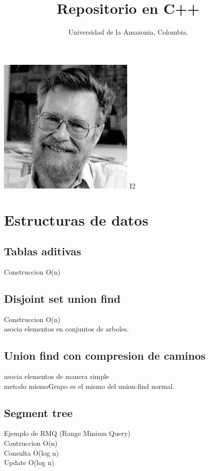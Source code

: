 \documentclass[10pt,landscape,twocolumn,a4paper,notitlepage]{article}
\newcommand\cppfile[2][]{

}
\begin{document}
	
	\title{Repositorio en C++}
	\author{Universidad de la Amazonia, Colombia.}
	\maketitle
	
	\begin{center}
		\includegraphics[scale=0.9]{dijkstra}
		\Huge{I2}
	\end{center}
	\normalsize
	\tableofcontents
	\hfill
	
		\section{Estructuras de datos}
			\subsection{Tablas aditivas}
			Construccion O(n)
			\cppfile[16-28]{estructuras_de_datos/tablas_aditivas.cpp}
			\subsection{Disjoint set union find}
			Construccion O(n)\\asocia elementos en conjuntos de arboles.
			\cppfile[6-53]{estructuras_de_datos/disjoint_set_union_find.cpp}
			\subsection{Union find con compresion de caminos}
			asocia elementos de manera simple\\
			metodo mismoGrupo es el mismo del union-find normal.
			\cppfile[9-37]{estructuras_de_datos/union_find-compresion_de_caminos.cpp}
			\subsection{Segment tree}
			Ejemplo de RMQ (Range Minium Query)\\
			Contruccion O(n)\\Consulta O(log n)\\Update O(log n)
			\cppfile[8-68]{estructuras_de_datos/segment_tree.cpp}%
\end{document}
